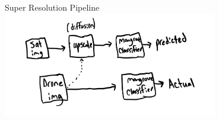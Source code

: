 \begin{frame}{Super Resolution Pipeline}
    \centering
    \includegraphics[height=0.7\textheight,width=0.7\textwidth,keepaspectratio]{images/superres.jpeg}
\end{frame}




